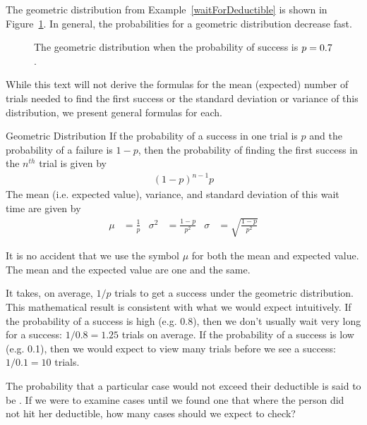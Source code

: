 The geometric distribution from Example~\ref{waitForDeductible} is shown in Figure~\ref{geometricDist70}. In general, the probabilities for a geometric distribution decrease  fast.

\begin{figure}[h]
  \centering
  \caption{The geometric distribution when the probability
      of success is $p = 0.7{}$.}
  \label{geometricDist70}
\end{figure}

While this text will not derive the formulas for the mean (expected) number of trials needed to find the first success or the standard deviation or variance of this distribution, we present general formulas for each.

\begin{onebox}{Geometric Distribution}
  If the probability of a success in one trial is $p$
  and the probability of a failure is $1-p$, then the
  probability of finding the first success in the
  $n^{th}$ trial is given by\vspace{-1.5mm}
  \begin{align*}
  (1-p)^{n-1}p
  \end{align*}
  The mean (i.e. expected value), variance,
  and standard deviation of this wait time are given by
  \begin{align*}
  \mu &= \frac{1}{p}
      &\sigma^2 &=\frac{1-p}{p^2}
      &\sigma &= \sqrt{\frac{1-p}{p^2}}
  \end{align*}
\end{onebox}

It is no accident that we use the symbol $\mu$ for both the mean and expected value. The mean and the expected value are one and the same.

It takes, on average, $1/p$ trials to get a success under the geometric distribution. This mathematical result is consistent with what we would expect intuitively. If the probability of a success is high (e.g. 0.8), then we don't usually wait very long for a success: $1/0.8 = 1.25$ trials on average. If the probability of a success is low (e.g. 0.1), then we would expect to view many trials before we see a success: $1/0.1 = 10$ trials.

\begin{exercisewrap}
\begin{nexercise}
The probability that a particular case would not exceed their
deductible is said to be \insureSprob{}.
If we were to examine cases until we found one that where
the person did not hit her deductible, how many cases should
we expect to check?\footnotemark{}
\end{nexercise}
\end{exercisewrap}

